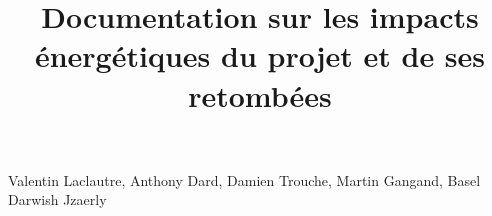\documentclass[12pt, a4paper, one side]{article}
\title{Documentation sur les impacts énergétiques du projet et de ses retombées}
\author{}
\date{}
\begin{document}
\maketitle

\begin{center}
    Valentin Laclautre, Anthony Dard, Damien Trouche, Martin Gangand, Basel Darwish Jzaerly
\end{center}

\tableofcontents
\end{document}
